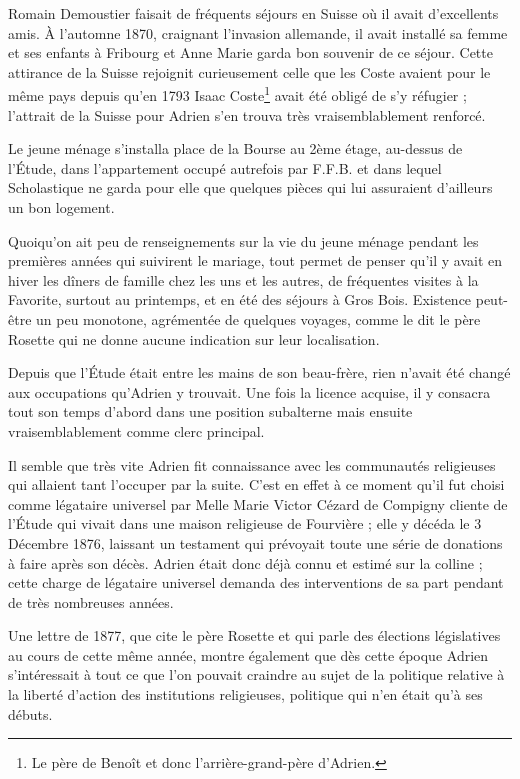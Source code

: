 \documentclass[11pt,a4paper]{report}
\begin{document}
Romain Demoustier faisait de fréquents séjours en Suisse où il avait d'excellents amis. À l'automne 1870, craignant l'invasion allemande, il avait installé sa femme et ses enfants à Fribourg et Anne Marie garda bon souvenir de ce séjour. Cette attirance de la Suisse rejoignit curieusement celle que les Coste avaient pour le même pays depuis qu'en 1793 Isaac Coste\footnote{Le père de Benoît et donc l'arrière-grand-père d'Adrien.} avait été obligé de s'y réfugier ; l'attrait de la Suisse pour Adrien s'en trouva très vraisemblablement renforcé.

Le jeune ménage s'installa place de la Bourse au 2ème étage, au-dessus de l'Étude, dans l'appartement occupé autrefois par F.F.B. et dans lequel Scholastique ne garda pour elle que quelques pièces qui lui assuraient d'ailleurs un bon logement.

Quoiqu'on ait peu de renseignements sur la vie du jeune ménage pendant les premières années qui suivirent le mariage, tout permet de penser qu'il y avait en hiver les dîners de famille chez les uns et les autres, de fréquentes visites à la Favorite, surtout au printemps, et en été des séjours à Gros Bois. Existence peut-être un peu monotone, agrémentée de quelques voyages, comme le dit le père Rosette qui ne donne aucune indication sur leur localisation.

Depuis que l'Étude était entre les mains de son beau-frère, rien n'avait été changé aux occupations qu'Adrien y trouvait. Une fois la licence acquise, il y consacra tout son temps d'abord dans une position subalterne mais ensuite vraisemblablement comme clerc principal.


Il semble que très vite Adrien fit connaissance avec les communautés religieuses qui allaient tant l'occuper par la suite. C'est en effet à ce moment qu'il fut choisi comme légataire universel par Melle Marie Victor Cézard de Compigny cliente de l'Étude qui vivait dans une maison religieuse de Fourvière ; elle y décéda le 3 Décembre 1876, laissant un testament qui prévoyait toute une série de donations à faire après son décès. Adrien était donc déjà connu et estimé sur la colline ; cette charge de légataire universel demanda des interventions de sa part pendant de très nombreuses années.

Une lettre de 1877, que cite le père Rosette et qui parle des élections législatives au cours de cette même année, montre également que dès cette époque Adrien s'intéressait à tout ce que l'on pouvait craindre au sujet de la politique relative à la liberté d'action des institutions religieuses, politique qui n'en était qu'à ses débuts.
\end{document}
